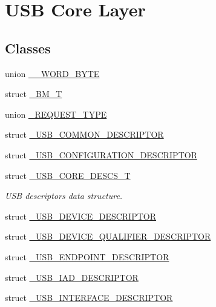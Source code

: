\hypertarget{group__USBD__Core}{}\section{U\+SB Core Layer}
\label{group__USBD__Core}
\subsection*{Classes}
\begin{DoxyCompactItemize}
\item 
union \hyperlink{union____WORD__BYTE}{\+\_\+\+\_\+\+W\+O\+R\+D\+\_\+\+B\+Y\+TE}
\item 
struct \hyperlink{struct__BM__T}{\+\_\+\+B\+M\+\_\+T}
\item 
union \hyperlink{union__REQUEST__TYPE}{\+\_\+\+R\+E\+Q\+U\+E\+S\+T\+\_\+\+T\+Y\+PE}
\item 
struct \hyperlink{struct__USB__COMMON__DESCRIPTOR}{\+\_\+\+U\+S\+B\+\_\+\+C\+O\+M\+M\+O\+N\+\_\+\+D\+E\+S\+C\+R\+I\+P\+T\+OR}
\item 
struct \hyperlink{struct__USB__CONFIGURATION__DESCRIPTOR}{\+\_\+\+U\+S\+B\+\_\+\+C\+O\+N\+F\+I\+G\+U\+R\+A\+T\+I\+O\+N\+\_\+\+D\+E\+S\+C\+R\+I\+P\+T\+OR}
\item 
struct \hyperlink{struct__USB__CORE__DESCS__T}{\+\_\+\+U\+S\+B\+\_\+\+C\+O\+R\+E\+\_\+\+D\+E\+S\+C\+S\+\_\+T}
\begin{DoxyCompactList}\small\item\em U\+SB descriptors data structure. \end{DoxyCompactList}\item 
struct \hyperlink{struct__USB__DEVICE__DESCRIPTOR}{\+\_\+\+U\+S\+B\+\_\+\+D\+E\+V\+I\+C\+E\+\_\+\+D\+E\+S\+C\+R\+I\+P\+T\+OR}
\item 
struct \hyperlink{struct__USB__DEVICE__QUALIFIER__DESCRIPTOR}{\+\_\+\+U\+S\+B\+\_\+\+D\+E\+V\+I\+C\+E\+\_\+\+Q\+U\+A\+L\+I\+F\+I\+E\+R\+\_\+\+D\+E\+S\+C\+R\+I\+P\+T\+OR}
\item 
struct \hyperlink{struct__USB__ENDPOINT__DESCRIPTOR}{\+\_\+\+U\+S\+B\+\_\+\+E\+N\+D\+P\+O\+I\+N\+T\+\_\+\+D\+E\+S\+C\+R\+I\+P\+T\+OR}
\item 
struct \hyperlink{struct__USB__IAD__DESCRIPTOR}{\+\_\+\+U\+S\+B\+\_\+\+I\+A\+D\+\_\+\+D\+E\+S\+C\+R\+I\+P\+T\+OR}
\item 
struct \hyperlink{struct__USB__INTERFACE__DESCRIPTOR}{\+\_\+\+U\+S\+B\+\_\+\+I\+N\+T\+E\+R\+F\+A\+C\+E\+\_\+\+D\+E\+S\+C\+R\+I\+P\+T\+OR}
\item 

\end{DoxyCompactItemize}
